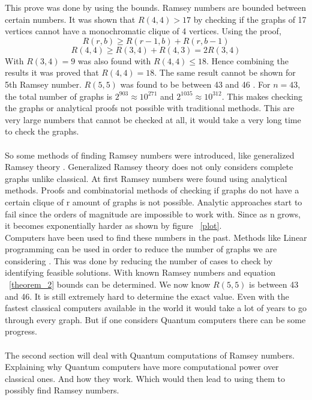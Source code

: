 \documentclass{Assignment}
\begin{document}
This prove was done by using the bounds.
Ramsey numbers are bounded between certain numbers.
It was shown that $R(4,4) > 17$ by checking if the graphs of 17 vertices cannot have a monochromatic clique of 4 vertices. 
Using the proof,
\begin{equation}
	R(r ,b) \geq R(r-1,b)+ R(r,b-1) 
	\label{theorem_2}
\end{equation}
$$R(4,4) \geq R(3,4)+R(4,3) = 2R(3,4)$$
With $R(3,4) =9 $ \cite{GreenwoodGleason1955} was also found with $R(4,4) \leq 18$.
Hence combining the results it was proved that $R(4,4) = 18$.
The same result cannot be shown for 5th Ramsey number.
$R(5,5)$ was found to be between 43 \cite{Exoo1993} and 46 \cite{angeltveit2024r55le46}.
For $n= 43$, the total number of graphs is $2^{903} \approx 10^{271}$ and  $2^{1035}\approx10^{312}$.
This makes checking the graphs or analytical proofs not possible with traditional methods.
This are very large numbers that cannot be checked at all, it would take a very long time to check the graphs.
\\\\
So some methods of finding Ramsey numbers were introduced, like generalized Ramsey theory \cite{burr1981generalized}. 
Generalized Ramsey theory does not only considers complete graphs unlike classical.
At first Ramsey numbers were found using analytical methods.
Proofs and combinatorial methods of checking if graphs do not have a certain clique of r amount of graphs is not possible.
Analytic approaches start to fail since the orders of magnitude are impossible to work with.
Since as n grows, it becomes exponentially harder as shown by figure ~\ref{plot}.
\\
Computers have been used to find these numbers in the past.
Methods like Linear programming can be used in order to reduce the number of graphs we are considering \cite{angeltveit2024r55le46}.
This was done by reducing the number of cases to check by identifying feasible solutions. 
With known Ramsey numbers and equation ~\ref{theorem_2} bounds can be determined.
We now know $R(5,5)$ is between 43 and 46.
It is still extremely hard to determine the exact value.
Even with the fastest classical computers available in the world it would take a lot of years to go through every graph.
But if one considers Quantum computers there can be some progress.
\\\\
The second section will deal with Quantum computations of Ramsey numbers.
Explaining why Quantum computers have more computational power over classical ones.
And how they work.	
Which would then lead to using them to possibly find Ramsey numbers.
\end{document}
